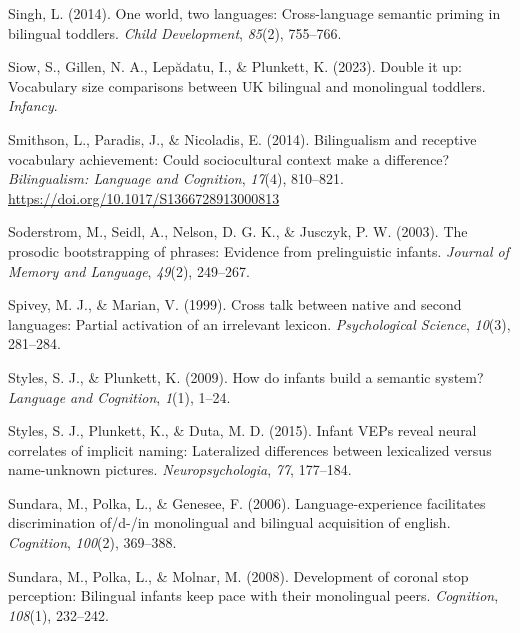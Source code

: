 \documentclass[
  12pt,
  b5paperpaper,
  twoside]{scrreprt}
\newlength{\cslhangindent}
\newlength{\cslentryspacingunit} %
\newenvironment{CSLReferences}[2] %
 {%
  \setlength{\parindent}{0pt}
  \ifodd #1
  \let\oldpar\par
  \def\par{\hangindent=\cslhangindent\oldpar}
  \fi
  \setlength{\parskip}{#2\cslentryspacingunit}
 }%
 {}
\begin{document}
\begin{CSLReferences}{1}{0}
\leavevmode{}%
Singh, L. (2014). One world, two languages: Cross-language semantic
priming in bilingual toddlers. \emph{Child Development}, \emph{85}(2),
755--766.

\leavevmode{}%
Siow, S., Gillen, N. A., Lepădatu, I., \& Plunkett, K. (2023). Double it
up: Vocabulary size comparisons between UK bilingual and monolingual
toddlers. \emph{Infancy}.

\leavevmode{}%
Smithson, L., Paradis, J., \& Nicoladis, E. (2014). Bilingualism and
receptive vocabulary achievement: Could sociocultural context make a
difference? \emph{Bilingualism: Language and Cognition}, \emph{17}(4),
810--821. \url{https://doi.org/10.1017/S1366728913000813}

\leavevmode{}%
Soderstrom, M., Seidl, A., Nelson, D. G. K., \& Jusczyk, P. W. (2003).
The prosodic bootstrapping of phrases: Evidence from prelinguistic
infants. \emph{Journal of Memory and Language}, \emph{49}(2), 249--267.

\leavevmode{}%
Spivey, M. J., \& Marian, V. (1999). Cross talk between native and
second languages: Partial activation of an irrelevant lexicon.
\emph{Psychological Science}, \emph{10}(3), 281--284.

\leavevmode{}%
Styles, S. J., \& Plunkett, K. (2009). How do infants build a semantic
system? \emph{Language and Cognition}, \emph{1}(1), 1--24.

\leavevmode{}%
Styles, S. J., Plunkett, K., \& Duta, M. D. (2015). Infant VEPs reveal
neural correlates of implicit naming: Lateralized differences between
lexicalized versus name-unknown pictures. \emph{Neuropsychologia},
\emph{77}, 177--184.

\leavevmode{}%
Sundara, M., Polka, L., \& Genesee, F. (2006). Language-experience
facilitates discrimination of/d-/in monolingual and bilingual
acquisition of english. \emph{Cognition}, \emph{100}(2), 369--388.

\leavevmode{}%
Sundara, M., Polka, L., \& Molnar, M. (2008). Development of coronal
stop perception: Bilingual infants keep pace with their monolingual
peers. \emph{Cognition}, \emph{108}(1), 232--242.


\end{CSLReferences}
\end{document}
